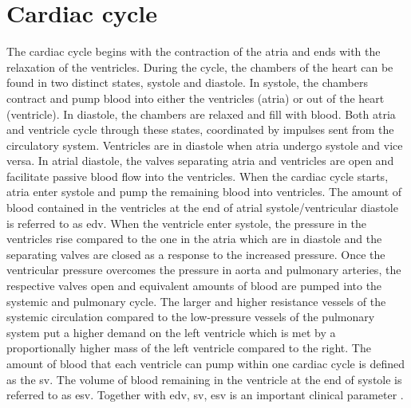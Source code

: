 \section{Cardiac cycle}
The cardiac cycle begins with the contraction of the atria and ends with the relaxation of the ventricles. During the cycle, the chambers of the heart can be found in two distinct states, systole and diastole. In systole, the chambers contract and pump blood into either the ventricles (atria) or out of the heart (ventricle). In diastole, the chambers are relaxed and fill with blood. Both atria and ventricle cycle through these states, coordinated by impulses sent from the circulatory system.  Ventricles are in diastole when atria undergo systole and vice versa. In atrial diastole, the valves separating atria and ventricles are open and facilitate passive blood flow into the ventricles. When the cardiac cycle starts, atria enter systole and pump the remaining blood into ventricles.  The amount of blood contained in the ventricles at the end of atrial systole/ventricular diastole is referred to as \gls{edv}. When the ventricle enter systole, the pressure in the ventricles rise compared to the one in the atria which are in diastole and the separating valves are closed as a response to the increased pressure. Once the ventricular pressure overcomes the pressure in aorta and pulmonary arteries, the respective valves open and equivalent amounts of blood are pumped into the systemic and pulmonary cycle. The larger and higher resistance vessels of the systemic circulation compared to the low-pressure vessels of the pulmonary system put a higher demand on the left ventricle which is met by a proportionally higher mass of the left ventricle compared to the right. The amount of blood that each ventricle can pump within one cardiac cycle is defined as the \gls{sv}. The volume of blood remaining in the ventricle at the end of systole is referred to as \gls{esv}. Together with \gls{edv}, \gls{sv}, \gls{esv} is an important clinical parameter \citep{Betts2013}. 

